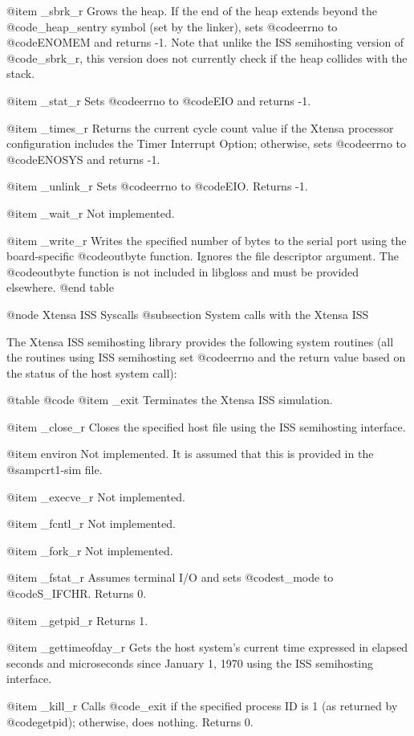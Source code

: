 @item _sbrk_r
Grows the heap.  If the end of the heap extends beyond the
@code{_heap_sentry} symbol (set by the linker), sets @code{errno} to
@code{ENOMEM} and returns -1.  Note that unlike the ISS semihosting
version of @code{_sbrk_r}, this version does not currently check if the
heap collides with the stack.

@item _stat_r
Sets @code{errno} to @code{EIO} and returns -1.

@item _times_r
Returns the current cycle count value if the Xtensa processor
configuration includes the Timer Interrupt Option; otherwise, sets
@code{errno} to @code{ENOSYS} and returns -1.

@item _unlink_r
Sets @code{errno} to @code{EIO}.  Returns -1.

@item _wait_r
Not implemented.

@item _write_r
Writes the specified number of bytes to the serial port using
the board-specific @code{outbyte} function.  Ignores the file descriptor
argument.  The @code{outbyte} function is not included in libgloss and
must be provided elsewhere.
@end table

@node Xtensa ISS Syscalls
@subsection System calls with the Xtensa ISS

The Xtensa ISS semihosting library provides the following
system routines (all the routines using ISS semihosting set @code{errno}
and the return value based on the status of the host system call):

@table @code
@item _exit
Terminates the Xtensa ISS simulation.

@item _close_r
Closes the specified host file using the ISS semihosting interface.

@item environ
Not implemented.  It is assumed that this is provided in the
@samp{crt1-sim} file.

@item _execve_r
Not implemented.

@item _fcntl_r
Not implemented.

@item _fork_r
Not implemented.

@item _fstat_r
Assumes terminal I/O and sets @code{st_mode} to @code{S_IFCHR}.
Returns 0.

@item _getpid_r
Returns 1.

@item _gettimeofday_r
Gets the host system's current time expressed in elapsed seconds and
microseconds since January 1, 1970 using the ISS semihosting interface.

@item _kill_r
Calls @code{_exit} if the specified process ID is 1 (as returned by
@code{getpid}); otherwise, does nothing.  Returns 0.


